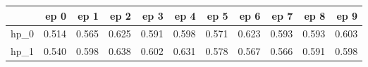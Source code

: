 \begin{tabular}{lrrrrrrrrrr}
\toprule
{} &   ep 0 &   ep 1 &   ep 2 &   ep 3 &   ep 4 &   ep 5 &   ep 6 &   ep 7 &   ep 8 &   ep 9 \\
\midrule
hp\_0 &  0.514 &  0.565 &  0.625 &  0.591 &  0.598 &  0.571 &  0.623 &  0.593 &  0.593 &  0.603 \\
hp\_1 &  0.540 &  0.598 &  0.638 &  0.602 &  0.631 &  0.578 &  0.567 &  0.566 &  0.591 &  0.598 \\
\bottomrule
\end{tabular}
